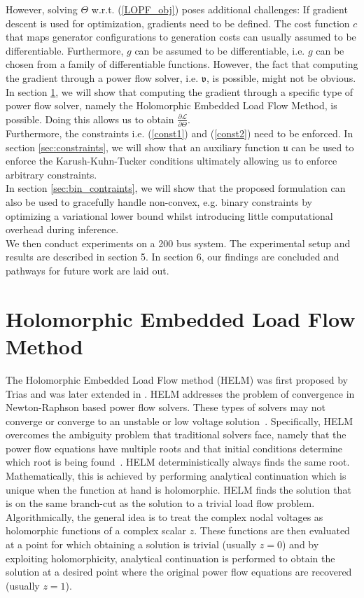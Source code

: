 However, solving $\Theta$ w.r.t. (\ref{LOPF_obj}) poses additional challenges: If gradient descent is used for optimization, gradients need to be defined. The cost function $c$ that maps generator configurations to generation costs can usually assumed to be differentiable. Furthermore, $g$ can be assumed to be differentiable, i.e. $g$ can be chosen from a family of differentiable functions. However, the fact that computing the gradient through a power flow solver, i.e. $\mathfrak{v}$, is possible, might not be obvious. In section \ref{sec:helm}, we will show that computing the gradient through a specific type of power flow solver, namely the Holomorphic Embedded Load Flow Method, is possible. Doing this allows us to obtain $\frac{\partial \mathcal{L}}{\partial \Theta}$.\\
Furthermore, the constraints i.e. (\ref{const1}) and (\ref{const2}) need to be enforced. In section \ref{sec:constraints}, we will show that an auxiliary function $\mathfrak{u}$ can be used to enforce the Karush-Kuhn-Tucker conditions ultimately allowing us to enforce arbitrary constraints.\\
In section \ref{sec:bin_contraints}, we will show that the proposed formulation can also be used to gracefully handle non-convex, e.g. binary constraints by optimizing a variational lower bound whilst introducing little computational overhead during inference.\\
We then conduct experiments on a 200 bus system. The experimental setup and results are described in section 5. In section 6, our findings are concluded and pathways for future work are laid out.


\section{Holomorphic Embedded Load Flow Method}
\label{sec:helm}
The Holomorphic Embedded Load Flow method (HELM) was first proposed by Trias \cite{trias2012holomorphic,trias2015fundamentals} and was later extended in \cite{subramanian2013pv,wallace2016alternative}. HELM addresses the problem of convergence in Newton-Raphson based power flow solvers. These types of solvers may not converge or converge to an unstable or low voltage solution~\cite{deng2013convergence}. Specifically, HELM overcomes the ambiguity problem that traditional solvers face, namely that the power flow equations have multiple roots and that initial conditions determine which root is being found~\cite{thorp1989load}. HELM deterministically always finds the same root. Mathematically, this is achieved by performing analytical continuation which is unique when the function at hand is holomorphic.  HELM finds the solution that is on the same branch-cut as the solution to a trivial load flow problem. Algorithmically, the general idea is to treat the complex nodal voltages as holomorphic functions of a complex scalar $z$. These functions are then evaluated at a point for which obtaining a solution is trivial (usually $z=0$) and by exploiting holomorphicity, analytical continuation is performed to obtain the solution at a desired point where the original power flow equations are recovered (usually $z = 1$).

